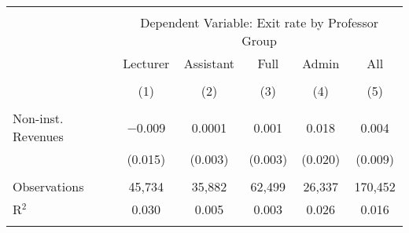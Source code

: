 
\begin{tabular}{@{\extracolsep{5pt}}lccccc} 
\\[-1.8ex]\hline 
\hline \\[-1.8ex] 
 & \multicolumn{5}{c}{Dependent Variable: Exit rate by Professor Group} \\ 
\cline{2-6} 
 & Lecturer & Assistant & Full & Admin & All \\ 
\\[-1.8ex] & (1) & (2) & (3) & (4) & (5)\\ 
\hline \\[-1.8ex] 
 Non-inst. Revenues & $-$0.009 & 0.0001 & 0.001 & 0.018 & 0.004 \\ 
  & (0.015) & (0.003) & (0.003) & (0.020) & (0.009) \\ 
 \hline \\[-1.8ex] 
Observations & 45,734 & 35,882 & 62,499 & 26,337 & 170,452 \\ 
R$^{2}$ & 0.030 & 0.005 & 0.003 & 0.026 & 0.016 \\ 
\hline 
\hline \\[-1.8ex] 
\end{tabular} 
